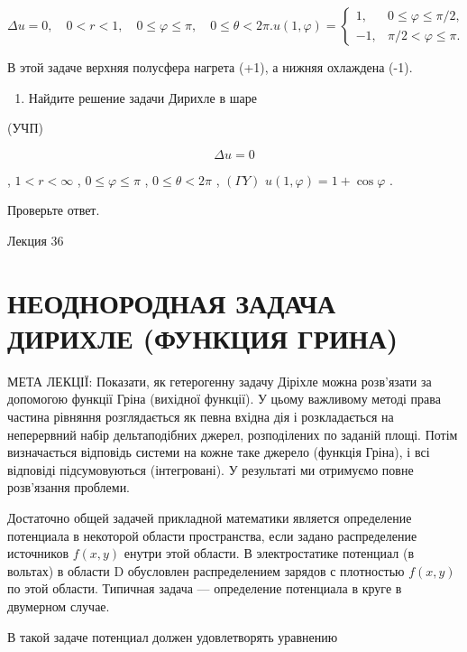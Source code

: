 \documentclass[
  ukrainian,
]{article}
\providecommand{\tightlist}{%
  \setlength{\itemsep}{0pt}\setlength{\parskip}{0pt}}
\begin{document}
\[
\Delta u = 0, \quad 0 < r < 1, \quad 0 \le \varphi \le \pi, \quad 0 \le \theta < 2\pi.
u(1, \varphi) =
\begin{cases} 1, & 0 \le \varphi \le \pi/2, \\ -1, & \pi/2 < \varphi \le \pi. \end{cases}
\]

В этой задаче верхняя полусфера нагрета (+1), а нижняя охлаждена (-1).

\begin{enumerate}
\def\labelenumi{\arabic{enumi}.}
\setcounter{enumi}{5}
\tightlist
\item
  Найдите решение задачи Дирихле в шаре
\end{enumerate}

(УЧП)

\[
\Delta u = 0
\]

, \(1 < r < \infty\) , \(0 \le \varphi \le \pi\) ,
\(0 \le \theta < 2\pi\) , \((\Gamma Y)\)
\(u(1, \varphi) = 1 + \cos \varphi\) .

Проверьте ответ.

Лекция 36

\section{НЕОДНОРОДНАЯ ЗАДАЧА ДИРИХЛЕ (ФУНКЦИЯ
ГРИНА)}\label{ux43dux435ux43eux434ux43dux43eux440ux43eux434ux43dux430ux44f-ux437ux430ux434ux430ux447ux430-ux434ux438ux440ux438ux445ux43bux435-ux444ux443ux43dux43aux446ux438ux44f-ux433ux440ux438ux43dux430}

МЕТА ЛЕКЦІЇ: Показати, як гетерогенну задачу Діріхле можна розв'язати за
допомогою функції Гріна (вихідної функції). У цьому важливому методі
права частина рівняння розглядається як певна вхідна дія і розкладається
на неперервний набір дельтаподібних джерел, розподілених по заданій
площі. Потім визначається відповідь системи на кожне таке джерело
(функція Гріна), і всі відповіді підсумовуються (інтегровані). У
результаті ми отримуємо повне розв'язання проблеми.

Достаточно общей задачей прикладной математики является определение
потенциала в некоторой области пространства, если задано распределение
источников \(f(x, y)\) енутри этой области. В электростатике потенциал
(в вольтах) в области D обусловлен распределением зарядов с плотностью
\(f(x, y)\) по этой области. Типичная задача --- определение потенциала
в круге в двумерном случае.

В такой задаче потенциал должен удовлетворять уравнению
\end{document}
